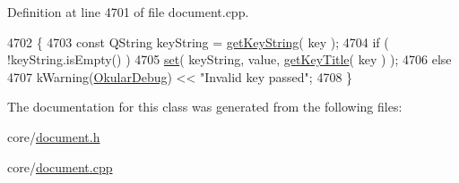 Definition at line 4701 of file document.\+cpp.


\begin{DoxyCode}
4702 \{
4703     \textcolor{keyword}{const} QString keyString = \hyperlink{classOkular_1_1DocumentInfo_a70cb5aa15e85e1690c7793ee9f4832b2}{getKeyString}( key );
4704     \textcolor{keywordflow}{if} ( !keyString.isEmpty() )
4705         \hyperlink{classOkular_1_1DocumentInfo_a8bd5403394ab192f1103cbf2a8e48d9b}{set}( keyString, value, \hyperlink{classOkular_1_1DocumentInfo_a488083cfce0989e5ec7bc5a1af55a111}{getKeyTitle}( key ) );
4706     \textcolor{keywordflow}{else}
4707         kWarning(\hyperlink{debug__p_8h_af16c6e32a95969dd0605d792ec9807c7}{OkularDebug}) << \textcolor{stringliteral}{"Invalid key passed"};
4708 \}
\end{DoxyCode}


The documentation for this class was generated from the following files\+:\begin{DoxyCompactItemize}
\item 
core/\hyperlink{core_2document_8h}{document.\+h}\item 
core/\hyperlink{core_2document_8cpp}{document.\+cpp}\end{DoxyCompactItemize}
